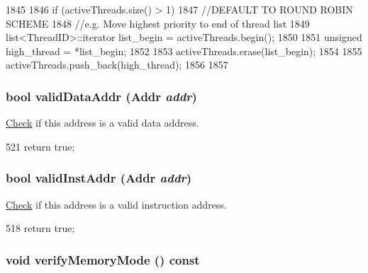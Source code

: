 \begin{DoxyCode}
1845 {
1846     if (activeThreads.size() > 1) {
1847         //DEFAULT TO ROUND ROBIN SCHEME
1848         //e.g. Move highest priority to end of thread list
1849         list<ThreadID>::iterator list_begin = activeThreads.begin();
1850 
1851         unsigned high_thread = *list_begin;
1852 
1853         activeThreads.erase(list_begin);
1854 
1855         activeThreads.push_back(high_thread);
1856     }
1857 }
\end{DoxyCode}
\hypertarget{classFullO3CPU_afe01e4cef8897b8a4ff99d575875c9db}{
\subsubsection[{validDataAddr}]{\setlength{\rightskip}{0pt plus 5cm}bool validDataAddr ({\bf Addr} {\em addr})}}
\label{classFullO3CPU_afe01e4cef8897b8a4ff99d575875c9db}
\hyperlink{classCheck}{Check} if this address is a valid data address. 


\begin{DoxyCode}
521 { return true; }
\end{DoxyCode}
\hypertarget{classFullO3CPU_af5f6a59bc2ed83b0cf9203ba8c63bf34}{
\subsubsection[{validInstAddr}]{\setlength{\rightskip}{0pt plus 5cm}bool validInstAddr ({\bf Addr} {\em addr})}}
\label{classFullO3CPU_af5f6a59bc2ed83b0cf9203ba8c63bf34}
\hyperlink{classCheck}{Check} if this address is a valid instruction address. 


\begin{DoxyCode}
518 { return true; }
\end{DoxyCode}
\hypertarget{classFullO3CPU_ae2e1ccebe596a180f8105d57f9a93645}{
\subsubsection[{verifyMemoryMode}]{\setlength{\rightskip}{0pt plus 5cm}void verifyMemoryMode () const}}
\label{classFullO3CPU_ae2e1ccebe596a180f8105d57f9a93645}



